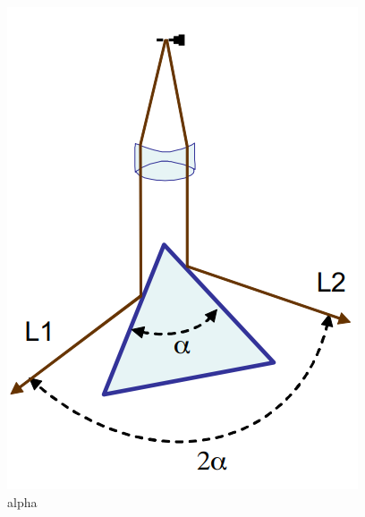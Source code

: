 \begin{figure}[H]
	\centering	    
	\includegraphics[scale=0.35]{figuras/alpha.png}
	\caption{alpha}
	\label{fig:alpha}
\end{figure}